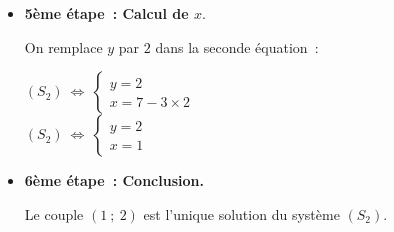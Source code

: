 {\begin{itemize}
          $(S_2)~\Leftrightarrow~\begin{cases} y=\dfrac{-34}{-17} \\  x=7-3y\end{cases}$\\
          $(S_2)~\Leftrightarrow~\begin{cases} y=2\\  x=7-3y\end{cases}$\\
          \item %
          \textbf{5ème étape~: Calcul de $x.$}
          \par
          On  remplace $y$ par $2$ dans la seconde équation~:
          \par
          $(S_2)~\Leftrightarrow~\begin{cases}  y=2\\  x=7-3 \times 2\end{cases}$\\
          $(S_2)~\Leftrightarrow~\begin{cases} y=2\\  x=1\end{cases}$\\
          \item %
          \textbf{6ème étape~: Conclusion. }
          \par
          Le couple $(1~;~2)$ est l'unique solution du système $(S_2)$.
     \end{itemize}
} %
